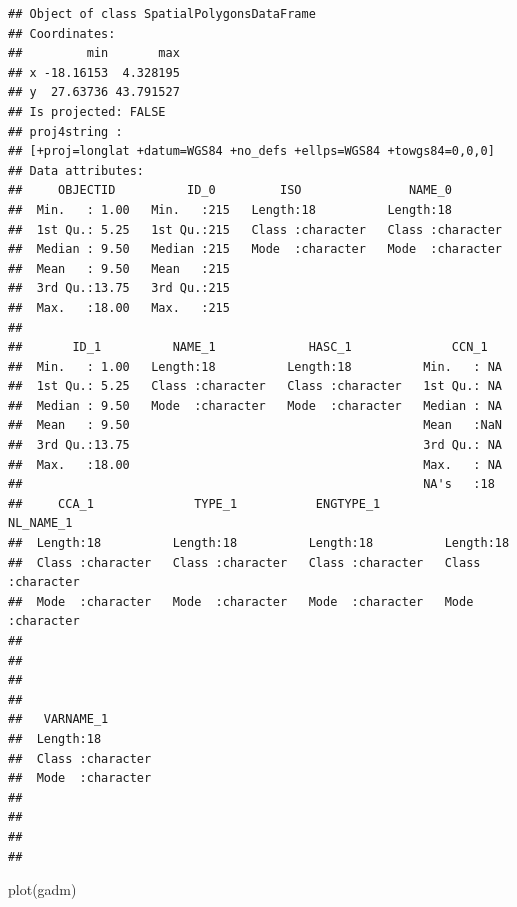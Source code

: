 \documentclass[
  spanish,
]{book}
\newenvironment{Shaded}{\begin{snugshade}}{\end{snugshade}}
\newcommand{\FunctionTok}[1]{\textcolor[rgb]{0.00,0.00,0.00}{#1}}
\newcommand{\NormalTok}[1]{#1}
\theoremstyle{break}
\begin{document}
\begin{verbatim}
## Object of class SpatialPolygonsDataFrame
## Coordinates:
##         min       max
## x -18.16153  4.328195
## y  27.63736 43.791527
## Is projected: FALSE 
## proj4string :
## [+proj=longlat +datum=WGS84 +no_defs +ellps=WGS84 +towgs84=0,0,0]
## Data attributes:
##     OBJECTID          ID_0         ISO               NAME_0         
##  Min.   : 1.00   Min.   :215   Length:18          Length:18         
##  1st Qu.: 5.25   1st Qu.:215   Class :character   Class :character  
##  Median : 9.50   Median :215   Mode  :character   Mode  :character  
##  Mean   : 9.50   Mean   :215                                        
##  3rd Qu.:13.75   3rd Qu.:215                                        
##  Max.   :18.00   Max.   :215                                        
##                                                                     
##       ID_1          NAME_1             HASC_1              CCN_1    
##  Min.   : 1.00   Length:18          Length:18          Min.   : NA  
##  1st Qu.: 5.25   Class :character   Class :character   1st Qu.: NA  
##  Median : 9.50   Mode  :character   Mode  :character   Median : NA  
##  Mean   : 9.50                                         Mean   :NaN  
##  3rd Qu.:13.75                                         3rd Qu.: NA  
##  Max.   :18.00                                         Max.   : NA  
##                                                        NA's   :18   
##     CCA_1              TYPE_1           ENGTYPE_1          NL_NAME_1        
##  Length:18          Length:18          Length:18          Length:18         
##  Class :character   Class :character   Class :character   Class :character  
##  Mode  :character   Mode  :character   Mode  :character   Mode  :character  
##                                                                             
##                                                                             
##                                                                             
##                                                                             
##   VARNAME_1        
##  Length:18         
##  Class :character  
##  Mode  :character  
##                    
##                    
##                    
## 
\end{verbatim}

\begin{Shaded}
\begin{Highlighting}[]
\FunctionTok{plot}\NormalTok{(gadm)}
\end{Highlighting}
\end{Shaded}
\end{document}
